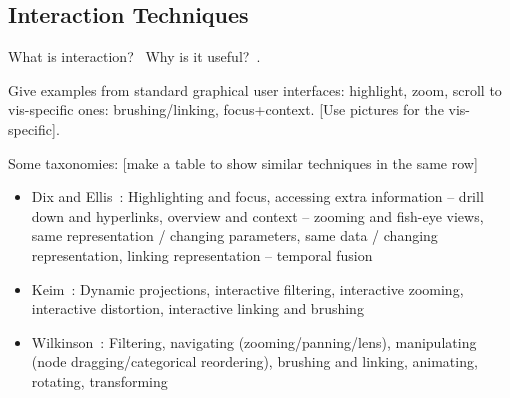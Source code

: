 %
%
%
%

%
%

\subsection{Interaction Techniques}
What is interaction?~\cite{Pike2009a} Why is it useful?~\cite{Munzner2014}. 

Give examples from standard graphical user interfaces: highlight, zoom, scroll to vis-specific ones: brushing/linking, focus+context. [Use pictures for the vis-specific].

Some taxonomies: [make a table to show similar techniques in the same row]
\begin{itemize}
	\item Dix and Ellis~\cite{Dix1998}: Highlighting and focus, accessing extra
	information -- drill down and hyperlinks, overview
	and context -- zooming and fish-eye views, same representation / changing
	parameters, same data / changing representation,
	linking representation – temporal fusion
	\item Keim~\cite{Keim2002}: Dynamic projections, interactive filtering,
	interactive zooming, interactive distortion,
	interactive linking and brushing
	\item Wilkinson~\cite{Wilkinson2005}: Filtering, navigating (zooming/panning/lens),
	manipulating (node dragging/categorical
	reordering), brushing and linking, animating, rotating, transforming
\end{itemize}

